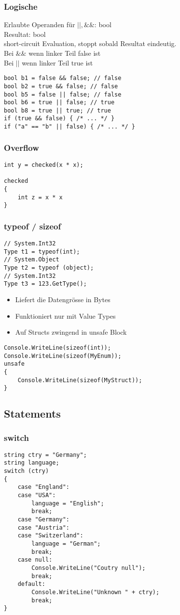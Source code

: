 \begin{multicols*}{2}
\subsubsection{Logische}
Erlaubte Operanden für $||, \&\&$: bool
\\Resultat: bool
\\short-circuit Evaluation, stoppt sobald Resultat eindeutig. 
\\Bei $\&\&$ wenn linker Teil false ist
\\Bei $||$ wenn linker Teil true ist
\begin{lstlisting}
bool b1 = false && false; // false 
bool b2 = true && false; // false 
bool b5 = false || false; // false 
bool b6 = true || false; // true 
bool b8 = true || true; // true
if (true && false) { /* ... */ }
if ("a" == "b" || false) { /* ... */ } 
\end{lstlisting}
\subsubsection{Overflow}
\begin{lstlisting}
int y = checked(x * x);

checked
{
    int z = x * x
}
\end{lstlisting}
\subsubsection{typeof / sizeof}
\begin{lstlisting}
// System.Int32
Type t1 = typeof(int);
// System.Object
Type t2 = typeof (object);
// System.Int32
Type t3 = 123.GetType();
\end{lstlisting}
\begin{itemize}
    \item Liefert die Datengrösse in Bytes
    \item Funktioniert nur mit Value Types
    \item Auf Structs zwingend in unsafe Block
\end{itemize}
\begin{lstlisting}
Console.WriteLine(sizeof(int)); 
Console.WriteLine(sizeof(MyEnum)); 
unsafe
{
    Console.WriteLine(sizeof(MyStruct)); 
}
\end{lstlisting}
\subsection{Statements}
\subsubsection{switch}
\begin{lstlisting}
string ctry = "Germany"; 
string language; 
switch (ctry)
{
    case "England":
    case "USA":
        language = "English";
        break;
    case "Germany":
    case "Austria":
    case "Switzerland":
        language = "German";
        break; 
    case null:
        Console.WriteLine("Coutry null");
        break;
    default:
        Console.WriteLine("Unknown " + ctry);
        break; 
}
\end{lstlisting}


\end{multicols*}

